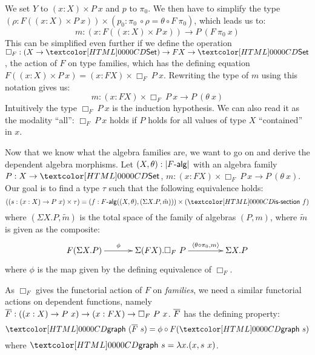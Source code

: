 We set $Y$ to $(x : X) \times P\ x$ and $p$ to $\pi_0$. We then have
to simplify the type
$(\rho : F ((x : X) \times P\ x)) \times (p_0 : \pi_0\ \circ \rho =
\theta \circ F\ \pi_0)$, which leads us to:
$$
m : (x : F ((x : X) \times P\ x)) \to P\ (F\ \pi_0\ x)
$$
This can be simplified even further if we define the operation
$\Box_F : (X \to \Set) \to FX \to \Set$, \ie the action of $F$ on type
families, which has the defining equation
$F ((x : X) \times P\ x) = (x : FX) \times \Box_F\ P\
x$. Rewriting the type of $m$ using this notation gives us:
$$
m : (x : FX) \times \Box_F\ P\ x \to P\ (\theta\ x)
$$
Intuitively the type $\Box_F\ P\ x$ is the induction hypothesis. We
can also read it as the modality ``all'': $\Box_F\ P\ x$ holds if $P$
holds for all values of type $X$ ``contained'' in $x$.

Now that we know what the algebra families are, we want to go on and
derive the dependent algebra morphisms. Let
$(X,\theta) : | \algcat{F} |$ with an algebra family $P : X \to \Set$,
$m : (x : FX) \times \Box_F\ P\ x \to P\ (\theta\ x)$. Our goal is to
find a type $\tau$ such that the following equivalence holds:
$$
((s : (x : X) \to P\ x) \times \tau) = (f : \algcat{F}((X,\theta),(\Sigma X . P , \tilde{m}))) \times (\issection\ f)
$$
where $(\Sigma X . P , \tilde{m})$ is the total space of the family of
algebras $(P,m)$, where $\tilde{m}$ is given as the composite:
$$
\xymatrix@!C{
  F (\Sigma X . P)
  \ar[r]^-{\phi}
  &\Sigma (FX) . \Box_F\ P
  \ar[r]^-{\langle \theta \circ \pi_0 , m \rangle}
  &\Sigma X . P
}
$$
where $\phi$ is the map given by the defining equivalence of $\Box_F$.

As $\Box_F$ gives the functorial action of $F$ on \emph{families}, we
need a similar functorial actions on dependent functions, namely
$\overline{F} : ((x : X) \to P\ x) \to (x : FX) \to \Box_F\ P\
x$. $\overline{F}$ has the defining property:
$$
\grph\ (\liftdephom{F}\ s) = \phi \circ F (\grph\ s)
$$
where $\grph\ s = \lambda x . (x , s\ x)$.

